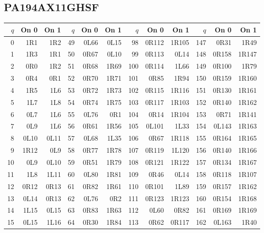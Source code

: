 \subsection{PA194AX11GHSF}
\begingroup\scriptsize
\setlength{\tabcolsep}{5pt}
\renewcommand{\arraystretch}{1.07}
\begin{center}
\begin{tabular}{rrr@{\hspace{7mm}}rrr@{\hspace{7mm}}rrr@{\hspace{7mm}}rrr}
\toprule
$q$ & On 0 & On 1 & $q$ & On 0 & On 1 & $q$ & On 0 & On 1 & $q$ & On 0 & On 1 \\
\midrule
0 & 1R1 & 1R2 & 49 & 0L66 & 0L15 & 98 & 0R112 & 1R105 & 147 & 0R31 & 1R49 \\
1 & 1R3 & 1R1 & 50 & 0R67 & 0L10 & 99 & 0R113 & 0L14 & 148 & 0R158 & 1R147 \\
2 & 0R0 & 1R2 & 51 & 0R68 & 1R69 & 100 & 0R114 & 1L66 & 149 & 0R100 & 1R79 \\
3 & 0R4 & 0R1 & 52 & 0R70 & 1R71 & 101 & 0R85 & 1R94 & 150 & 0R159 & 1R160 \\
4 & 1R5 & 1L6 & 53 & 0R72 & 1R73 & 102 & 0R115 & 1R116 & 151 & 0R130 & 1R161 \\
5 & 1L7 & 1L8 & 54 & 0R74 & 1R75 & 103 & 0R117 & 1R103 & 152 & 0R140 & 1R162 \\
6 & 0L7 & 1L6 & 55 & 0L76 & 0R1 & 104 & 0R14 & 1R104 & 153 & 0R71 & 1R141 \\
7 & 0L9 & 1L6 & 56 & 0R61 & 1R56 & 105 & 0L101 & 1L33 & 154 & 0L143 & 1R163 \\
8 & 0L10 & 0L11 & 57 & 0L68 & 1L35 & 106 & 0R67 & 1R118 & 155 & 0R164 & 1R165 \\
9 & 1R12 & 0L9 & 58 & 0R77 & 1R78 & 107 & 0R119 & 1L120 & 156 & 0R140 & 1R166 \\
10 & 0L9 & 0L10 & 59 & 0R51 & 1R79 & 108 & 0R121 & 1R122 & 157 & 0R134 & 1R167 \\
11 & 1L8 & 1L11 & 60 & 0L80 & 1R81 & 109 & 0R46 & 0L14 & 158 & 0R118 & 1R107 \\
12 & 0R12 & 0R13 & 61 & 0R82 & 1R61 & 110 & 0R101 & 1L89 & 159 & 0R157 & 1R162 \\
13 & 0L14 & 0R13 & 62 & 0L76 & 0R2 & 111 & 0R123 & 1R123 & 160 & 0R154 & 1R168 \\
14 & 1L15 & 0L15 & 63 & 0R83 & 1R63 & 112 & 0L60 & 0R82 & 161 & 0R169 & 1R169 \\
15 & 0L15 & 1L16 & 64 & 0R30 & 1R84 & 113 & 0R62 & 0R117 & 162 & 0L163 & 1R40 \\

\end{tabular}
\end{center}
